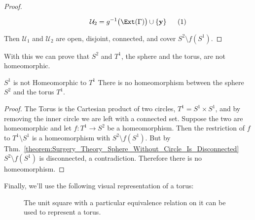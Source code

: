 \documentclass[crop=false,class=book,oneside]{standalone}                      %
\begin{document}
\begin{proof}
\begin{subequations}
\begin{minipage}[b]{0.49\textwidth}
                        \begin{equation}
                            \mathcal{U}_{2}
                            =g^{-1}\big(\Ext(\Gamma)\big)\cup\{\mathbf{y}\}
                        \end{equation}
                    \end{minipage}
                \end{subequations}
                \par\hfill\par
                Then $\mathcal{U}_{1}$ and $\mathcal{U}_{2}$ are open, disjoint,
                connected, and cover $S^{2}\setminus{f}(S^{1})$.
            \end{proof}
            With this we can prove that $S^{2}$ and $T^{1}$, the sphere and the
            torus, are not homeomorphic.
            \begin{ltheorem}{$S^{1}$ is not Homeomorphic to $T^{1}$}
                There is no homeomorphism between the sphere $S^{2}$ and
                the torus $T^{1}$.
            \end{ltheorem}
            \begin{proof}
                The Torus is the Cartesian product of two circles,
                $T^{1}=S^{1}\times{S}^{1}$, and by removing the inner circle we
                are left with a connected set. Suppose the two are homeomorphic and
                let $f:T^{1}\rightarrow{S}^{2}$ be a homeomorphism. Then the
                restriction of $f$ to $T^{1}\setminus{S}^{1}$ is a homeomorphism
                with $S^{2}\setminus{f}(S^{1})$. But by
                Thm.~\ref{theorem:Surgery_Theory_Sphere_Without_Circle_Is_Disconnected}
                $S^{2}\setminus{f}(S^{1})$ is disconnected, a contradiction.
                Therefore there is no homeomorphism.
            \end{proof}
            Finally, we'll use the following visual representation of a torus:
            \begin{figure}[H]
                \centering
                \captionsetup{type=figure}
                \caption[Plane Representation of a Torus]
                        {The unit square with a particular
                         equivalence relation on it can be
                         used to represent a torus.}
                \label{fig:surgery_theory_plane_%
                       representation_of_a_torus}
            \end{figure}
\end{document}

